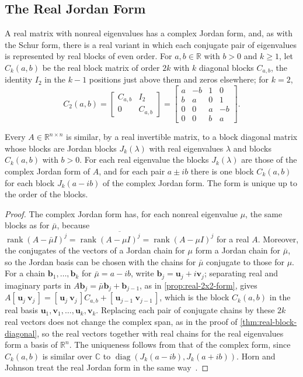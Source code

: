 \subsection{The Real Jordan Form}

A real matrix with nonreal eigenvalues has a complex Jordan form, and, as with the Schur form, there is a real variant in which each conjugate pair of eigenvalues is represented by real blocks of even order. For $a,b\in\mathbb R$ with $b>0$ and $k\ge1$, let $C_k(a,b)$ be the real block matrix of order $2k$ with $k$ diagonal blocks $C_{a,b}$, the identity $I_2$ in the $k-1$ positions just above them and zeros elsewhere; for $k=2$,
\[
C_2(a,b)=\begin{bmatrix}C_{a,b}&I_2\\0&C_{a,b}\end{bmatrix}=\begin{bmatrix}a&-b&1&0\\b&a&0&1\\0&0&a&-b\\0&0&b&a\end{bmatrix}.
\]

\begin{theorem}
\label{thm:real-jordan}
Every $A\in\mathbb R^{n\times n}$ is similar, by a real invertible matrix, to a block diagonal matrix whose blocks are Jordan blocks $J_k(\lambda)$ with real eigenvalues $\lambda$ and blocks $C_k(a,b)$ with $b>0$. For each real eigenvalue the blocks $J_k(\lambda)$ are those of the complex Jordan form of $A$, and for each pair $a\pm ib$ there is one block $C_k(a,b)$ for each block $J_k(a-ib)$ of the complex Jordan form. The form is unique up to the order of the blocks.
\end{theorem}

\begin{proof}
The complex Jordan form has, for each nonreal eigenvalue $\mu$, the same blocks as for $\bar\mu$, because $\operatorname{rank}(A-\bar\mu I)^j=\operatorname{rank}\overline{(A-\mu I)^j}=\operatorname{rank}(A-\mu I)^j$ for a real $A$. Moreover, the conjugates of the vectors of a Jordan chain for $\mu$ form a Jordan chain for $\bar\mu$, so the Jordan basis can be chosen with the chains for $\bar\mu$ conjugate to those for $\mu$. For a chain $\mathbf b_1,\ldots,\mathbf b_k$ for $\bar\mu=a-ib$, write $\mathbf b_j=\mathbf u_j+i\mathbf v_j$; separating real and imaginary parts in $A\mathbf b_j=\bar\mu\mathbf b_j+\mathbf b_{j-1}$, as in \cref{prop:real-2x2-form}, gives $A[\,\mathbf u_j\ \mathbf v_j\,]=[\,\mathbf u_j\ \mathbf v_j\,]C_{a,b}+[\,\mathbf u_{j-1}\ \mathbf v_{j-1}\,]$, which is the block $C_k(a,b)$ in the real basis $\mathbf u_1,\mathbf v_1,\ldots,\mathbf u_k,\mathbf v_k$. Replacing each pair of conjugate chains by these $2k$ real vectors does not change the complex span, as in the proof of \cref{thm:real-block-diagonal}, so the real vectors together with real chains for the real eigenvalues form a basis of $\mathbb R^n$. The uniqueness follows from that of the complex form, since $C_k(a,b)$ is similar over $\mathbb C$ to $\operatorname{diag}(J_k(a-ib),J_k(a+ib))$. Horn and Johnson treat the real Jordan form in the same way~\cite[Sect.~3.4]{horn2013}.
\end{proof}

